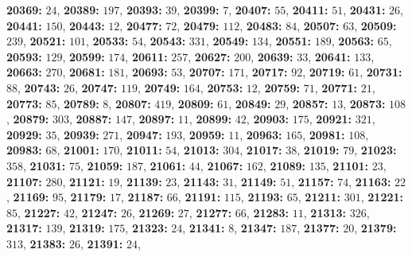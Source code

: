 \textsf{\bfseries 20369:} $24$, \textsf{\bfseries 20389:} $197$, \textsf{\bfseries 20393:} $39$, \textsf{\bfseries 20399:} $7$, \textsf{\bfseries 20407:} $55$, \textsf{\bfseries 20411:} $51$, \textsf{\bfseries 20431:} $26$, \textsf{\bfseries 20441:} $150$, \textsf{\bfseries 20443:} $12$, \textsf{\bfseries 20477:} $72$, \textsf{\bfseries 20479:} $112$, \textsf{\bfseries 20483:} $84$, \textsf{\bfseries 20507:} $63$, \textsf{\bfseries 20509:} $239$, \textsf{\bfseries 20521:} $101$, \textsf{\bfseries 20533:} $54$, \textsf{\bfseries 20543:} $331$, \textsf{\bfseries 20549:} $134$, \textsf{\bfseries 20551:} $189$, \textsf{\bfseries 20563:} $65$, \textsf{\bfseries 20593:} $129$, \textsf{\bfseries 20599:} $174$, \textsf{\bfseries 20611:} $257$, \textsf{\bfseries 20627:} $200$, \textsf{\bfseries 20639:} $33$, \textsf{\bfseries 20641:} $133$, \textsf{\bfseries 20663:} $270$, \textsf{\bfseries 20681:} $181$, \textsf{\bfseries 20693:} $53$, \textsf{\bfseries 20707:} $171$, \textsf{\bfseries 20717:} $92$, \textsf{\bfseries 20719:} $61$, \textsf{\bfseries 20731:} $88$, \textsf{\bfseries 20743:} $26$, \textsf{\bfseries 20747:} $119$, \textsf{\bfseries 20749:} $164$, \textsf{\bfseries 20753:} $12$, \textsf{\bfseries 20759:} $71$, \textsf{\bfseries 20771:} $21$, \textsf{\bfseries 20773:} $85$, \textsf{\bfseries 20789:} $8$, \textsf{\bfseries 20807:} $419$, \textsf{\bfseries 20809:} $61$, \textsf{\bfseries 20849:} $29$, \textsf{\bfseries 20857:} $13$, \textsf{\bfseries 20873:} $108$, \textsf{\bfseries 20879:} $303$, \textsf{\bfseries 20887:} $147$, \textsf{\bfseries 20897:} $11$, \textsf{\bfseries 20899:} $42$, \textsf{\bfseries 20903:} $175$, \textsf{\bfseries 20921:} $321$, \textsf{\bfseries 20929:} $35$, \textsf{\bfseries 20939:} $271$, \textsf{\bfseries 20947:} $193$, \textsf{\bfseries 20959:} $11$, \textsf{\bfseries 20963:} $165$, \textsf{\bfseries 20981:} $108$, \textsf{\bfseries 20983:} $68$, \textsf{\bfseries 21001:} $170$, \textsf{\bfseries 21011:} $54$, \textsf{\bfseries 21013:} $304$, \textsf{\bfseries 21017:} $38$, \textsf{\bfseries 21019:} $79$, \textsf{\bfseries 21023:} $358$, \textsf{\bfseries 21031:} $75$, \textsf{\bfseries 21059:} $187$, \textsf{\bfseries 21061:} $44$, \textsf{\bfseries 21067:} $162$, \textsf{\bfseries 21089:} $135$, \textsf{\bfseries 21101:} $23$, \textsf{\bfseries 21107:} $280$, \textsf{\bfseries 21121:} $19$, \textsf{\bfseries 21139:} $23$, \textsf{\bfseries 21143:} $31$, \textsf{\bfseries 21149:} $51$, \textsf{\bfseries 21157:} $74$, \textsf{\bfseries 21163:} $22$, \textsf{\bfseries 21169:} $95$, \textsf{\bfseries 21179:} $17$, \textsf{\bfseries 21187:} $66$, \textsf{\bfseries 21191:} $115$, \textsf{\bfseries 21193:} $65$, \textsf{\bfseries 21211:} $301$, \textsf{\bfseries 21221:} $85$, \textsf{\bfseries 21227:} $42$, \textsf{\bfseries 21247:} $26$, \textsf{\bfseries 21269:} $27$, \textsf{\bfseries 21277:} $66$, \textsf{\bfseries 21283:} $11$, \textsf{\bfseries 21313:} $326$, \textsf{\bfseries 21317:} $139$, \textsf{\bfseries 21319:} $175$, \textsf{\bfseries 21323:} $24$, \textsf{\bfseries 21341:} $8$, \textsf{\bfseries 21347:} $187$, \textsf{\bfseries 21377:} $20$, \textsf{\bfseries 21379:} $313$, \textsf{\bfseries 21383:} $26$, \textsf{\bfseries 21391:} $24$, 
